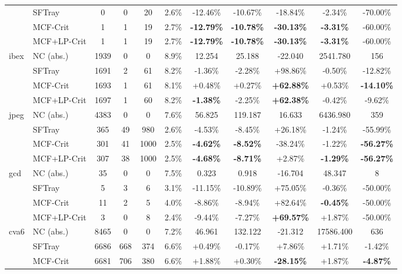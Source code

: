 \begin{table}[t]
{\begin{tabular}{ll|cccc|ccc|cc}
 & SFTray & 0 & 0 & 20 & 2.6\% & -12.46\% & -10.67\% & -18.84\% & -2.34\% & -70.00\% \\
 & MCF-Crit & 1 & 1 & 19 & 2.7\% & \textbf{-12.79\%} & \textbf{-10.78\%} & \textbf{-30.13\%} & \textbf{-3.31\%} & -60.00\% \\
 & MCF+LP-Crit & 1 & 1 & 19 & 2.7\% & \textbf{-12.79\%} & \textbf{-10.78\%} & \textbf{-30.13\%} & \textbf{-3.31\%} & -60.00\% \\
\midrule
\multirow{4}{*}{ibex} & NC (abs.) & 1939 & 0 & 0 & 8.9\% & 12.254 & 25.188 & -22.040 & 2541.780 & 156 \\
 & SFTray & 1691 & 2 & 61 & 8.2\% & -1.36\% & -2.28\% & +98.86\% & -0.50\% & -12.82\% \\
 & MCF-Crit & 1693 & 1 & 61 & 8.1\% & +0.48\% & +0.27\% & \textbf{+62.88\%} & +0.53\% & \textbf{-14.10\%} \\
 & MCF+LP-Crit & 1697 & 1 & 60 & 8.2\% & \textbf{-1.38\%} & -2.25\% & \textbf{+62.38\%} & -0.42\% & -9.62\% \\
\midrule
\multirow{4}{*}{jpeg} & NC (abs.) & 4383 & 0 & 0 & 7.6\% & 56.825 & 119.187 & 16.633 & 6436.980 & 359 \\
 & SFTray & 365 & 49 & 980 & 2.6\% & -4.53\% & -8.45\% & +26.18\% & -1.24\% & -55.99\% \\
 & MCF-Crit & 301 & 41 & 1000 & 2.5\% & \textbf{-4.62\%} & \textbf{-8.52\%} & -38.24\% & -1.22\% & \textbf{-56.27\%} \\
 & MCF+LP-Crit & 307 & 38 & 1000 & 2.5\% & \textbf{-4.68\%} & \textbf{-8.71\%} & +2.87\% & \textbf{-1.29\%} & \textbf{-56.27\%} \\
\midrule
\multirow{4}{*}{gcd} & NC (abs.) & 35 & 0 & 0 & 7.5\% & 0.323 & 0.918 & -16.704 & 48.347 & 8 \\
 & SFTray & 5 & 3 & 6 & 3.1\% & -11.15\% & -10.89\% & +75.05\% & -0.36\% & -50.00\% \\
 & MCF-Crit & 11 & 2 & 5 & 4.0\% & -8.86\% & -8.94\% & +82.64\% & \textbf{-0.45\%} & -50.00\% \\
 & MCF+LP-Crit & 3 & 0 & 8 & 2.4\% & -9.44\% & -7.27\% & \textbf{+69.57\%} & +1.87\% & -50.00\% \\
\midrule
\multirow{4}{*}{cva6} & NC (abs.) & 8465 & 0 & 0 & 7.2\% & 46.961 & 132.122 & -21.312 & 17586.400 & 636 \\
 & SFTray & 6686 & 668 & 374 & 6.6\% & +0.49\% & -0.17\% & +7.86\% & +1.71\% & -1.42\% \\
 & MCF-Crit & 6681 & 706 & 380 & 6.6\% & +1.88\% & +0.30\% & \textbf{-28.15\%} & +1.87\% & \textbf{-4.87\%} \\

\end{tabular}}
\end{table}
